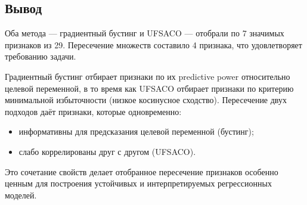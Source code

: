 \subsection{Вывод}

Оба метода --- градиентный бустинг и UFSACO --- отобрали по 7 значимых признаков из 29. Пересечение множеств составило 4 признака, что удовлетворяет требованию задачи.

Градиентный бустинг отбирает признаки по их predictive power относительно целевой переменной, в то время как UFSACO отбирает признаки по критерию минимальной избыточности (низкое косинусное сходство). Пересечение двух подходов даёт признаки, которые одновременно:
\begin{itemize}
    \item информативны для предсказания целевой переменной (бустинг);
    \item слабо коррелированы друг с другом (UFSACO).
\end{itemize}

Это сочетание свойств делает отобранное пересечение признаков особенно ценным для построения устойчивых и интерпретируемых регрессионных моделей.
